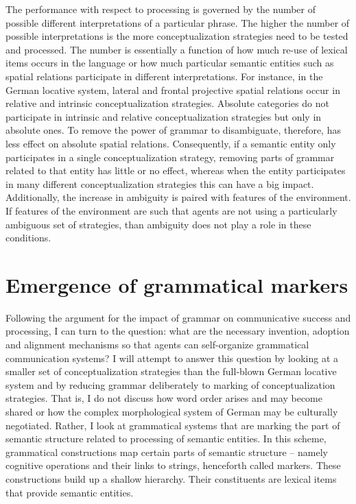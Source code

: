 The performance with respect to processing is governed by the number of
possible different interpretations of a particular phrase. The higher the number of 
possible interpretations is the more conceptualization strategies need to be tested 
and processed. The number is essentially a function of how much re-use of 
lexical items occurs in the language or how much particular semantic entities 
such as spatial relations participate in different interpretations.
For instance, in the German locative system, lateral and frontal projective 
spatial relations occur in relative and intrinsic conceptualization strategies. 
Absolute categories do not participate in intrinsic and relative conceptualization 
strategies but only in absolute ones. To remove the power 
of grammar to disambiguate, therefore, has less effect on absolute spatial 
relations. Consequently, if a semantic entity only participates
in a single conceptualization strategy, removing parts of grammar related 
to that entity has little or no effect, whereas when the entity participates 
in many different conceptualization 
strategies this can have a big impact. Additionally, the increase in ambiguity is paired
with features of the environment. If features of the environment are such that agents 
are not using a particularly ambiguous set of strategies, than ambiguity 
does not play a role in these conditions.


\section{Emergence of grammatical markers}
Following the argument for the impact of grammar on communicative success 
and processing, I can turn to the question: what are the necessary 
invention, adoption and alignment mechanisms so that agents can self-organize grammatical communication systems? 
I will attempt to answer this question by looking at a smaller set of conceptualization strategies than the full-blown
German locative system and by reducing grammar deliberately to marking of conceptualization strategies. 
That is, I do not discuss how word order arises and may become shared or how the complex morphological system of German 
may be culturally negotiated. Rather, I look at grammatical systems that are 
marking the part of semantic structure related to processing of semantic entities. 
In this scheme, grammatical constructions map certain parts of semantic structure 
-- namely cognitive operations and their links to strings, henceforth called markers.
These constructions build up a shallow hierarchy. Their constituents are
 lexical items that provide semantic entities.

